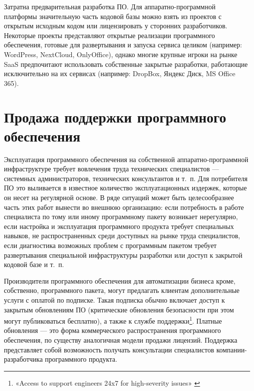 \documentclass{article}
\begin{document}
Затратна предварительная разработка ПО. Для аппаратно-программной платформы значительную часть кодовой базы можно взять из проектов с открытым исходным кодом или лицензировать у сторонних разработчиков. Некоторые проекты представляют открытые реализации программного обеспечения, готовые для развертывания и запуска сервиса целиком (например: WordPress, NextCloud, OnlyOffice), однако многие крупные игроки на рынке SaaS предпочитают использовать собственные закрытые разработки, работающие исключительно на их сервисах (например: DropBox, Яндекс Диск, MS Office 365).

\section*{Продажа поддержки программного обеспечения}

Эксплуатация программного обеспечения на собственной аппаратно-программной инфраструктуре требует вовлечения труда технических специалистов — системных администраторов, технических консультантов и т.~п. Для потребителя ПО это выливается в известное количество эксплуатационных издержек, которые он несет на регулярной основе. В ряде ситуаций может быть целесообразнее часть этих работ вынести во внешнюю организацию: если потребность в работе специалиста по тому или иному программному пакету возникает нерегулярно, если настройка и эксплуатация программного продукта требует специальных навыков, не распространенных среди доступных на рынке труда специалистов, если диагностика возможных проблем с программным пакетом требует развертывания специальной инфраструктуры разработки или доступ к закрытой кодовой базе и т.~п.

Производители программного обеспечения для автоматизации бизнеса кроме, собственно, программного пакета, могут предлагать клиентам дополнительные услуги с оплатой по подписке. Такая подписка обычно включает доступ к закрытым обновлениям ПО (критические обновления безопасности при этом могут публиковаться бесплатно), а также к службе поддержки\footnote{«Access to support engineers 24x7 for high-severity issues» \cite{redhatSubscriptionModel}}. Платные обновления — это форма коммерческого распространения программного обеспечения, по существу аналогичная модели продажи лицензий. Поддержка представляет собой возможность получать консультации специалистов компании-разработчика программного продукта.
\end{document}
